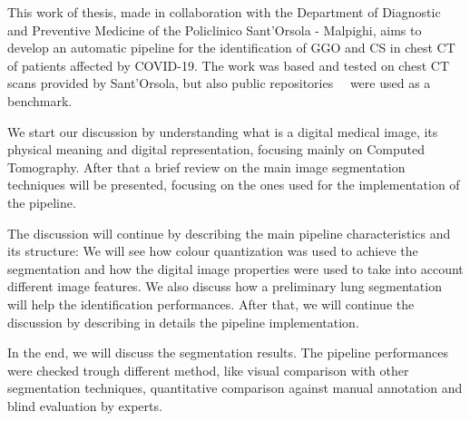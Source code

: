 \documentclass{standalone}
\begin{document}
	This work of thesis, made in collaboration with the Department of Diagnostic and Preventive Medicine of the Policlinico Sant'Orsola - Malpighi, aims to develop an automatic pipeline for the identification of GGO and CS in chest CT of patients affected by COVID-19. The work was based and tested on chest CT scans provided by Sant'Orsola, but also public repositories~\cite{DATA:ZENODO}~\cite{DATA:MOSMED} were used as a benchmark.

	We start our discussion by understanding what is a digital medical image, its physical meaning and digital representation, focusing mainly on Computed Tomography. After that a brief review on the main image segmentation techniques will be presented, focusing on the ones used for the implementation of the pipeline.

	The discussion will continue by describing the main pipeline characteristics and its structure: We will see how colour quantization was used to achieve the segmentation and how the digital image properties were used to take into account different image features. We also discuss how a preliminary lung segmentation will help the identification performances. After that, we will continue the discussion by describing in details the pipeline implementation.

	In the end, we will discuss the segmentation results. The pipeline performances were checked trough different method, like visual comparison with other segmentation techniques, quantitative comparison against manual annotation and blind evaluation by experts. 
\end{document}
